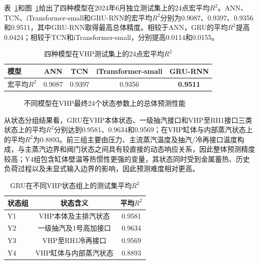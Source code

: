 表~\ref{tab:model_macro_r2}和图~\ref{fig:model_macro_r2}给出了四种模型在2024年6月独立测试集上的24点宏平均$R^2$。ANN、TCN、iTransformer-small和GRU-RNN的宏平均$R^2$分别为0.9087、0.9397、0.9356和0.9511，其中GRU-RNN取得最高总体精度。相较于ANN，GRU的平均$R^2$提高0.0424；相较于TCN和iTransformer-small，分别提高0.0114和0.0155。

\begin{table}[htbp]
\centering
\caption{四种模型在VHP测试集上的24点宏平均$R^2$}
\label{tab:model_macro_r2}
\begin{tabular}{lcccc}
\toprule
模型 & ANN & TCN & iTransformer-small & GRU-RNN\\
\midrule
宏平均$R^2$ & 0.9087 & 0.9397 & 0.9356 & \textbf{0.9511}\\
\bottomrule
\end{tabular}
\end{table}

\begin{figure}[htbp]
    \centering
    \caption{不同模型在VHP最终24个状态参数上的总体预测性能}
    \label{fig:model_macro_r2}
\end{figure}

从状态分组结果看，GRU在VHP本体状态、一级抽汽接口和VHP至RH1接口三类状态上的平均$R^2$分别达到0.9581、0.9634和0.9569；在VHP缸体与内部蒸汽状态上的平均$R^2$为0.8893。前三组主要由压力、主流蒸汽温度及抽汽/冷再接口温度构成，与主蒸汽边界和阀门状态之间具有较直接的动态响应关系，因此整体预测精度较高；Y4组包含缸体壁温等热惯性更强的变量，其状态同时受到金属蓄热、历史负荷过程以及未显式输入边界的影响，因此预测难度相对更高。

\begin{table}[htbp]
\centering
\caption{GRU在不同VHP状态组上的测试集平均$R^2$}
\label{tab:gru_group_r2}
\begin{tabular}{lcc}
\toprule
状态组 & 状态含义 & 平均$R^2$\\
\midrule
Y1 & VHP本体及主排汽状态 & 0.9581\\
Y2 & 一级抽汽及1号高加接口 & 0.9634\\
Y3 & VHP至RH1冷再接口 & 0.9569\\
Y4 & VHP缸体与内部蒸汽状态 & 0.8893\\
\bottomrule
\end{tabular}
\end{table}

